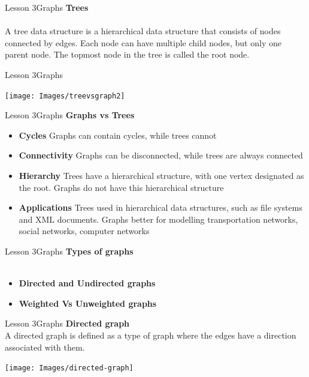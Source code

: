 \documentclass[aspectratio=1610]{beamer}
\begin{document}
\begin{frame}{Lesson 3}{Graphs}
\LARGE
\textbf{Trees}\\~\\
A tree data structure is a hierarchical data structure that consists
of nodes connected by edges. Each node can have multiple child
nodes, but only one parent node. The topmost node in the tree is
called the root node.
\end{frame}


\begin{frame}{Lesson 3}{Graphs}
\begin{center}
\texttt{[image: Images/treevsgraph2]}
\end{center}
\end{frame}


\begin{frame}{Lesson 3}{Graphs}
\LARGE
\textbf{Graphs vs Trees}\\
\Large
\begin{itemize}
    \item \textbf{Cycles} Graphs can contain cycles, while trees cannot
    \item \textbf{Connectivity} Graphs can be disconnected, while trees are always connected
    \item \textbf{Hierarchy} Trees have a hierarchical structure, with one vertex designated as the root. Graphs do not have this hierarchical structure
    \item \textbf{Applications} Trees used in hierarchical data structures, such as file systems and XML documents. Graphs better for modelling transportation networks, social networks, computer networks
\end{itemize}
\end{frame}



\begin{frame}{Lesson 3}{Graphs}
\LARGE
\textbf{Types of graphs}\\~\\
\Large
\begin{itemize}
	\item \textbf{Directed and Undirected graphs}
	\item \textbf{Weighted Vs Unweighted graphs}
\end{itemize}
\end{frame}



\begin{frame}{Lesson 3}{Graphs}
\LARGE
\textbf{Directed graph}\\
A directed graph is defined as a type of graph where the edges have
a direction associated with them.
\begin{center}
\texttt{[image: Images/directed-graph]}
\end{center}
\end{frame}
\end{document}
